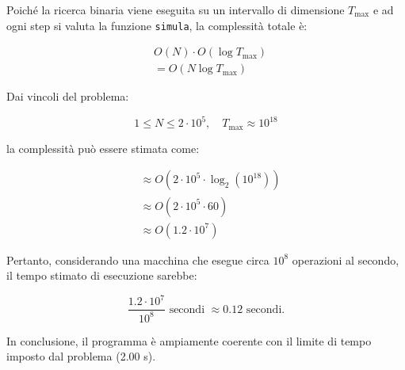 Poiché la ricerca binaria viene eseguita su un intervallo di dimensione $T_\text{max}$ e ad ogni step si valuta la funzione \texttt{simula}, la complessità totale è:

\begin{align*}
	&O(N) \cdot O(\log T_\text{max}) \\
	&= O(N \log T_\text{max})
\end{align*}

Dai vincoli del problema:

\[
1 \le N \le 2 \cdot 10^5, \quad T_\text{max} \approx 10^{18}
\]

la complessità può essere stimata come:

\begin{align*}
	&\approx O(2 \cdot 10^5 \cdot \log_2(10^{18})) \\
	&\approx O(2 \cdot 10^5 \cdot 60) \\
	&\approx O(1.2 \cdot 10^7)
\end{align*}

Pertanto, considerando una macchina che esegue circa $10^8$ operazioni al secondo, il tempo stimato di esecuzione sarebbe:

\[
\frac{1.2 \cdot 10^7}{10^8} \text{ secondi } \approx 0.12 \text{ secondi.}
\]

\noindent
In conclusione, il programma è ampiamente coerente con il limite di tempo imposto dal problema (2.00 s).
